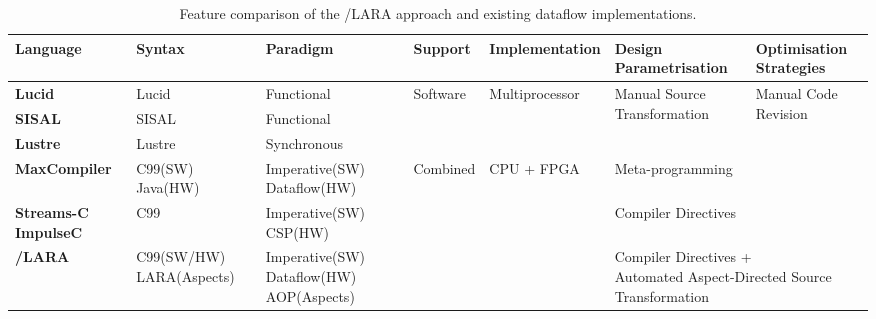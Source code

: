 \begin{table}
  \renewcommand{\arraystretch}{2.1}
  \centering
  \label{table:feature-comparison}
  \begin{tabularx}{\textwidth}{ m{2.5cm} | p{2.5cm} | p{3cm} | p{1.9cm}| p{2.8cm} | p{3.2cm} | p{2.5cm}}
    \hline
    \bf{Language}                 & \bf{Syntax}              & \bf{Paradigm}                            & \bf{Support}              & \bf{Implementation}             & \bf{Design Parametrisation}                     & \bf{Optimisation Strategies}            \\
    \hline \hline
    \bf{Lucid}                    & Lucid                    & Functional                               & \multirow{3}{*}{Software} & \multirow{3}{*}{Multiprocessor} & \multirow{3}{3cm}{Manual Source Transformation} & \multirow{5}{3cm}{Manual Code Revision} \\
    \cline{1-3}
    \bf{SISAL}                    & SISAL                    & Functional                               &                           &                                 &                                                 &                                         \\
    \cline{1-3}
    \bf{Lustre}                   & Lustre                   & Synchronous                              &                           &                                 &                                                 &                                         \\
    \cline{1-6}
    \bf{MaxCompiler}              & C99(SW) Java(HW)         & Imperative(SW) Dataflow(HW)              & \multirow{6}{*}{Combined} & \multirow{6}{*}{CPU + FPGA}     & Meta-programming                                &                                         \\
    \cline{1-3}\cline{6}
    \bf{Streams-C} \bf{ImpulseC}\ & C99                      & Imperative(SW) CSP(HW)                   &                           &                                 & Compiler \newline Directives                    &                                         \\
     \cline{1-3}\cline{6-7}
    \bf{\FAST{}}/\bf{LARA}        & C99(SW/HW) LARA(Aspects) & Imperative(SW) Dataflow(HW) AOP(Aspects) &                           &                                 & \multicolumn{2}{p{5.5cm}}{Compiler Directives + \newline Automated Aspect-Directed Source Transformation} \\
  \end{tabularx}
  \caption{Feature comparison of the \FAST{}/LARA approach and existing dataflow implementations.}
\end{table}


